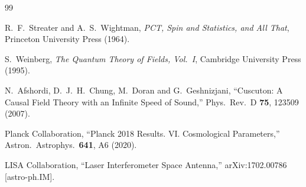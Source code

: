 \documentclass[11pt,a4paper]{article}
\begin{document}
\begin{thebibliography}{99}

R.~F.~Streater and A.~S.~Wightman,
\textit{PCT, Spin and Statistics, and All That},
Princeton University Press (1964).

S.~Weinberg,
\textit{The Quantum Theory of Fields, Vol.~I},
Cambridge University Press (1995).

N.~Afshordi, D.~J.~H.~Chung, M.~Doran and G.~Geshnizjani,
``Cuscuton: A Causal Field Theory with an Infinite Speed of Sound,''
Phys.\ Rev.\ D \textbf{75}, 123509 (2007).

Planck Collaboration,
``Planck 2018 Results. VI. Cosmological Parameters,''
Astron.\ Astrophys.\ \textbf{641}, A6 (2020).

LISA Collaboration,
``Laser Interferometer Space Antenna,''
arXiv:1702.00786 [astro-ph.IM].

\end{thebibliography}
\end{document}
